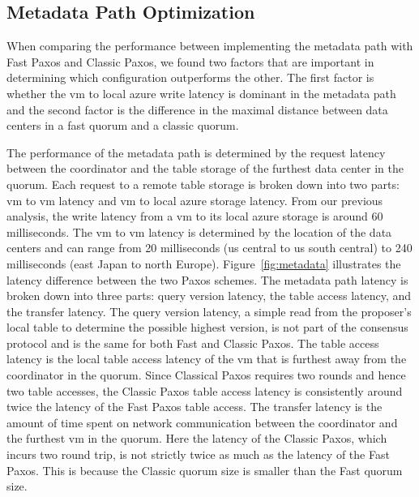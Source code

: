 

\subsection{Metadata Path Optimization}
When comparing the performance between implementing the metadata path with Fast Paxos and Classic Paxos, we found two factors that are important in determining which configuration outperforms the other.  The first factor is whether the vm to local azure write latency is dominant in the metadata path and the second factor is the difference in the maximal distance between data centers in a fast quorum and a classic quorum. 

The performance of the metadata path is determined by the request latency between the coordinator and the table storage of the furthest data center in the quorum. Each request to a remote table storage is broken down into two parts: vm to vm latency and vm to local azure storage latency. From our previous analysis, the write latency from a vm to its local azure storage is around 60 milliseconds. The vm to vm latency is determined by the location of the data centers and can range from 20 milliseconds (us central to us south central) to 240 milliseconds (east Japan to north Europe). Figure~\ref{fig:metadata} illustrates the latency difference between the two Paxos schemes. The metadata path latency is broken down into three parts: query version latency, the table access latency, and the transfer latency. The query version latency, a simple read from the proposer’s local table to determine the possible highest version, is not part of the consensus protocol and is the same for both Fast and Classic Paxos. The table access latency is the local table access latency of the vm that is furthest away from the coordinator in the quorum. Since Classical Paxos requires two rounds and hence two table accesses, the Classic Paxos table access latency is consistently around twice the latency of the Fast Paxos table access. The transfer latency is the amount of time spent on network communication between the coordinator and the furthest vm in the quorum. Here the latency of the Classic Paxos, which incurs two round trip, is not strictly twice as much as the latency of the Fast Paxos. This is because the Classic quorum size is smaller than the Fast quorum size.


